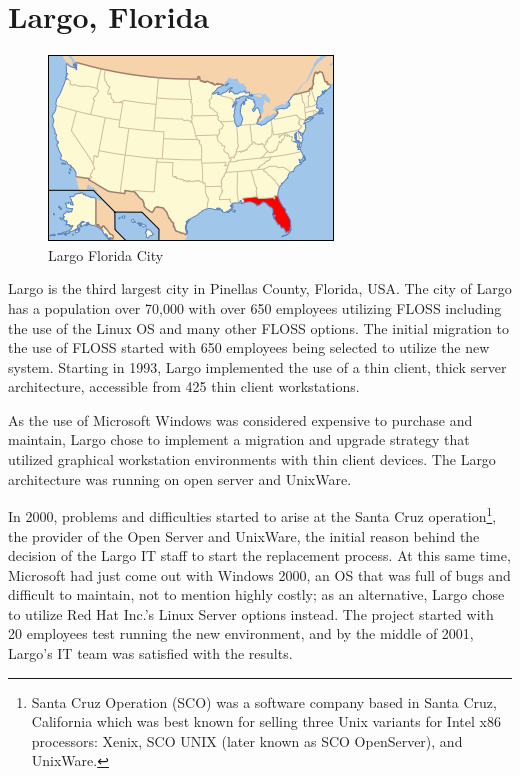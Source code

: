 \section {Largo, Florida}
\label{largo}
\begin{figure}[H]
\centering
    \includegraphics[scale=0.8]{img/Largo.png} 
  \caption{ Largo Florida City}
    \end{figure}
    
Largo is the third largest city in Pinellas County, Florida, USA.
The city of Largo has a population over 70,000 with over 650 employees utilizing FLOSS including the use of the Linux OS and many other FLOSS options. The initial migration to the use of FLOSS started with 650 employees being selected to utilize the new system. Starting in 1993, Largo implemented the use of a thin client, thick server architecture, accessible from 425 thin client workstations.

As the use of Microsoft Windows was considered expensive to purchase and maintain, Largo chose to implement a migration and upgrade strategy that utilized graphical workstation environments with thin client devices. The Largo architecture was running on open server and UnixWare. 

In 2000, problems and difficulties started to arise at the Santa Cruz operation\footnote{Santa Cruz Operation (SCO) was a software company based in Santa Cruz, California which was best known for selling three Unix variants for Intel x86 processors: Xenix, SCO UNIX (later known as SCO OpenServer), and UnixWare.}, the provider of the Open Server and UnixWare, the initial reason behind the decision of the Largo IT staff to start the replacement process. At this same time, Microsoft had just come out with Windows 2000, an OS that was full of bugs and difficult to maintain, not to mention highly costly; as an alternative, Largo chose to utilize Red Hat Inc.’s Linux Server options instead. The project started with 20 employees test running the new environment, and by the middle of 2001, Largo’s IT team was satisfied with the results.

